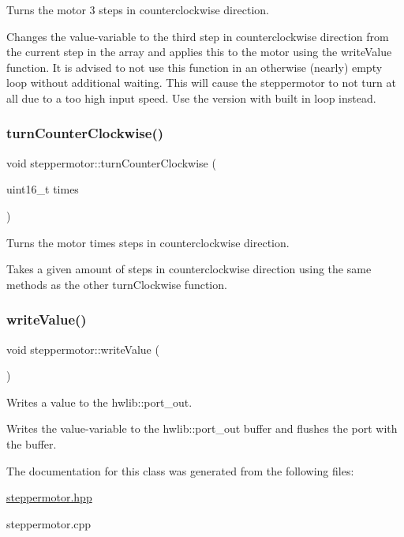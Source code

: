 Turns the motor 3 steps in counterclockwise direction. 

Changes the value-\/variable to the third step in counterclockwise direction from the current step in the array and applies this to the motor using the write\+Value function. It is advised to not use this function in an otherwise (nearly) empty loop without additional waiting. This will cause the steppermotor to not turn at all due to a too high input speed. Use the version with built in loop instead. \mbox{\label{classsteppermotor_a4ab2f609263941da26ef0b46046848c1}} 
\subsubsection{\texorpdfstring{turn\+Counter\+Clockwise()}{turnCounterClockwise()}\hspace{0.1cm}{\footnotesize\ttfamily [2/2]}}
{\footnotesize\ttfamily void steppermotor\+::turn\+Counter\+Clockwise (\begin{DoxyParamCaption}\item[{uint16\+\_\+t}]{times }\end{DoxyParamCaption})\hspace{0.3cm}{\ttfamily [virtual]}}



Turns the motor \textquotesingle{}times\textquotesingle{} steps in counterclockwise direction. 

Takes a given amount of steps in counterclockwise direction using the same methods as the other turn\+Clockwise function. \mbox{\label{classsteppermotor_a62618fa568d97c9508bee0af4b66128e}} 
\subsubsection{\texorpdfstring{write\+Value()}{writeValue()}}
{\footnotesize\ttfamily void steppermotor\+::write\+Value (\begin{DoxyParamCaption}{ }\end{DoxyParamCaption})\hspace{0.3cm}{\ttfamily [virtual]}}



Writes a value to the hwlib\+::port\+\_\+out. 

Writes the value-\/variable to the hwlib\+::port\+\_\+out buffer and flushes the port with the buffer. 

The documentation for this class was generated from the following files\+:\begin{DoxyCompactItemize}
\item 
\hyperlink{steppermotor_8hpp}{steppermotor.\+hpp}\item 
steppermotor.\+cpp\end{DoxyCompactItemize}
